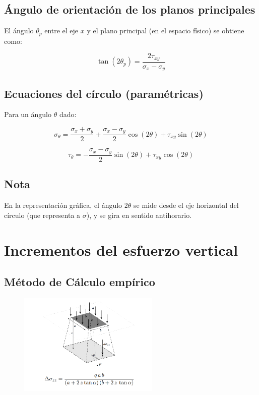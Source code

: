 \documentclass{article} %
\begin{document}
\subsection*{Ángulo de orientación de los planos principales}

El ángulo $\theta_p$ entre el eje $x$ y el plano principal (en el espacio físico) se obtiene como:

\[
\tan(2\theta_p) = \frac{2\tau_{xy}}{\sigma_x - \sigma_y}
\]

\subsection*{Ecuaciones del círculo (paramétricas)}

Para un ángulo $\theta$ dado:

\[
\sigma_\theta = \frac{\sigma_x + \sigma_y}{2} + \frac{\sigma_x - \sigma_y}{2} \cos(2\theta) + \tau_{xy} \sin(2\theta)
\]

\[
\tau_\theta = -\frac{\sigma_x - \sigma_y}{2} \sin(2\theta) + \tau_{xy} \cos(2\theta)
\]

\subsection*{Nota}

En la representación gráfica, el ángulo $2\theta$ se mide desde el eje horizontal del círculo (que representa a $\sigma$), y se gira en sentido antihorario.

\newpage
\section{Incrementos del esfuerzo vertical}

\subsection*{Método de Cálculo empírico}

\begin{figure}[H]
    \centering
    \includegraphics[width=0.6\textwidth]{Graficos/emp1.png}
    \label{fig:incremento_esfuerzo_vertical}
\end{figure}
\end{document}
